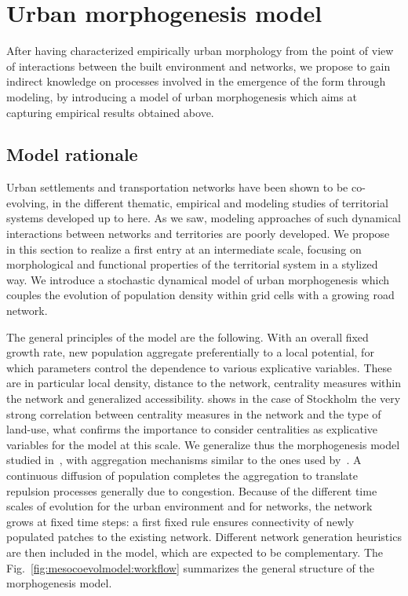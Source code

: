\documentclass[11pt]{article}
\begin{document}
\section{Urban morphogenesis model}

After having characterized empirically urban morphology from the point of view of interactions between the built environment and networks, we propose to gain indirect knowledge on processes involved in the emergence of the form through modeling, by introducing a model of urban morphogenesis which aims at capturing empirical results obtained above.

\subsection{Model rationale}


Urban settlements and transportation networks have been shown to be co-evolving, in the different thematic, empirical  and modeling studies of territorial systems developed up to here. As we saw, modeling approaches of such dynamical interactions between networks and territories are poorly developed. We propose in this section to realize a first entry at an intermediate scale, focusing on morphological and functional properties of the territorial system in a stylized way. We introduce a stochastic dynamical model of urban morphogenesis which couples the evolution of population density within grid cells with a growing road network.


The general principles of the model are the following. With an overall fixed growth rate, new population aggregate preferentially to a local potential, for which parameters control the dependence to various explicative variables. These are in particular local density, distance to the network, centrality measures within the network and generalized accessibility. \cite{doi:10.1080/13658816.2014.893347} shows in the case of Stockholm the very strong correlation between centrality measures in the network and the type of land-use, what confirms the importance to consider centralities as explicative variables for the model at this scale. We generalize thus the morphogenesis model studied in~\cite{2017arXiv170806743R}, with aggregation mechanisms similar to the ones used by~\cite{raimbault2014hybrid}. A continuous diffusion of population completes the aggregation to translate repulsion processes generally due to congestion. Because of the different time scales of evolution for the urban environment and for networks, the network grows at fixed time steps: a first fixed rule ensures connectivity of newly populated patches to the existing network. Different network generation heuristics are then included in the model, which are expected to be complementary. The Fig.~\ref{fig:mesocoevolmodel:workflow} summarizes the general structure of the morphogenesis model.
\end{document}
